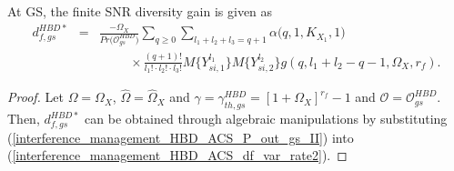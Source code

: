 \begin{proposition}
At GS, the finite SNR diversity gain is given as
\begin{eqnarray} \label{interference_management_HBD_ACS_df_var_gs}
d_{f,gs}^{HBD*} & = & \frac{-\Omega_X}{Pr\big(\mathcal{O}_{gs}^{HBD}\big)} \sum_{q\geq0}\sum_{l_1+l_2+l_3=q+1} \alpha\big(q,1,K_{X_1},1\big) \nonumber \\
 & & \hspace{1cm} \times \frac{(q+1)!}{l_1! \cdot l_2! \cdot l_3!} M\{Y_{si,1}^{l_1}\} M\{Y_{si,2}^{l_2}\} g(q,l_1+l_2-q-1,\Omega_X,r_f).
\end{eqnarray}
\end{proposition}
\begin{proof}
Let $\Omega=\Omega_X$, $\widehat{\Omega}=\widehat{\Omega}_X$ and $\gamma = \gamma_{th,gs}^{HBD}=[1+\Omega_X]^{r_f}-1$ and $\mathcal{O} = \mathcal{O}_{gs}^{HBD}$. Then, $d_{f,gs}^{HBD*}$ can be obtained through algebraic manipulations by substituting (\ref{interference_management_HBD_ACS_P_out_gs_II}) into (\ref{interference_management_HBD_ACS_df_var_rate2}).
\end{proof}

